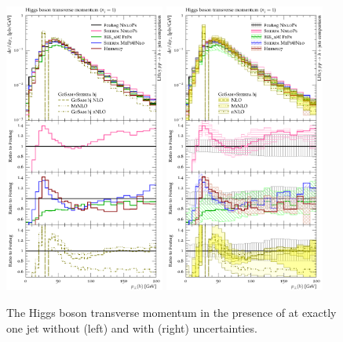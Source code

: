 \begin{figure}[t!]
  \includegraphics[width=0.47\textwidth]{figures/hjetscomp_u_H_j_pT_excl.pdf}
  \hfill
  \includegraphics[width=0.47\textwidth]{figures/hjetscomp_H_j_pT_excl.pdf}
  \caption{
    The Higgs boson transverse momentum in the presence of at exactly 
    one jet without (left) and with (right) uncertainties.
    \label{fig:higgscomp:results:1obs:hpt_excl}
  }
\end{figure}

